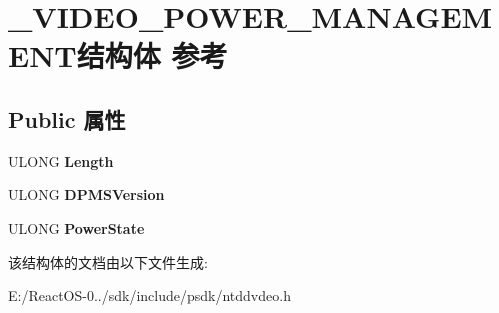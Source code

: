 \hypertarget{struct___v_i_d_e_o___p_o_w_e_r___m_a_n_a_g_e_m_e_n_t}{}\section{\+\_\+\+V\+I\+D\+E\+O\+\_\+\+P\+O\+W\+E\+R\+\_\+\+M\+A\+N\+A\+G\+E\+M\+E\+N\+T结构体 参考}
\label{struct___v_i_d_e_o___p_o_w_e_r___m_a_n_a_g_e_m_e_n_t}
\subsection*{Public 属性}
\begin{DoxyCompactItemize}
\item 
\mbox{\label{struct___v_i_d_e_o___p_o_w_e_r___m_a_n_a_g_e_m_e_n_t_a43253ec73dd9843f8e72d6180a99c7bd}} 
U\+L\+O\+NG {\bfseries Length}
\item 
\mbox{\label{struct___v_i_d_e_o___p_o_w_e_r___m_a_n_a_g_e_m_e_n_t_accc91c88250d7d89539acd7da118a585}} 
U\+L\+O\+NG {\bfseries D\+P\+M\+S\+Version}
\item 
\mbox{\label{struct___v_i_d_e_o___p_o_w_e_r___m_a_n_a_g_e_m_e_n_t_a8581452edec1f719c78bccc7c7883e6f}} 
U\+L\+O\+NG {\bfseries Power\+State}
\end{DoxyCompactItemize}


该结构体的文档由以下文件生成\+:\begin{DoxyCompactItemize}
\item 
E\+:/\+React\+O\+S-\/0../sdk/include/psdk/ntddvdeo.\+h\end{DoxyCompactItemize}
